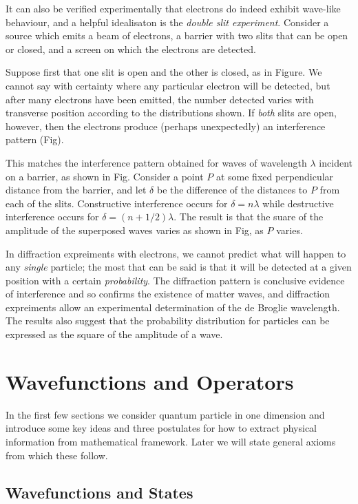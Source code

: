 \documentclass[a4paper]{article}
\theoremstyle{definition}
\begin{document}
It can also be verified experimentally that electrons do indeed exhibit wave-like behaviour, and a helpful idealisaton is the \emph{double slit experiment}. Consider a source which emits a beam of electrons, a barrier with two slits that can be open or closed, and a screen on which the electrons are detected.

Suppose first that one slit is open and the other is closed, as in Figure. We cannot say with certainty where any particular electron will be detected, but after many electrons have been emitted, the number detected varies with transverse position according to the distributions shown. If \emph{both} slits are open, however, then the electrons produce (perhaps unexpectedly) an interference pattern (Fig).

This matches the interference pattern obtained for waves of wavelength $\lambda$ incident on a barrier, as shown in Fig. Consider a point $P$ at some fixed perpendicular distance from the barrier, and let $\delta$ be the difference of the distances to $P$ from each of the slits. Constructive interference occurs for $\delta=n\lambda$ while destructive interference occurs for $\delta=(n+1/2)\lambda$. The result is that the suare of the amplitude of the superposed waves varies as shown in Fig, as $P$ varies.

In diffraction expreiments with electrons, we cannot predict what will happen to any \emph{single} particle; the most that can be said is that it will be detected at a given position with a certain \emph{probability}. The diffraction pattern is conclusive evidence of interference and so confirms the existence of matter waves, and diffraction expreiments allow an experimental determination of the de Broglie wavelength. The results also suggest that the probability distribution for particles can be expressed as the square of the amplitude of a wave.

\section{Wavefunctions and Operators}

In the first few sections we consider quantum particle in one dimension and introduce some key ideas and three postulates for how to extract physical information from mathematical framework. Later we will state general axioms from which these follow.

\subsection{Wavefunctions and States}
\end{document}
